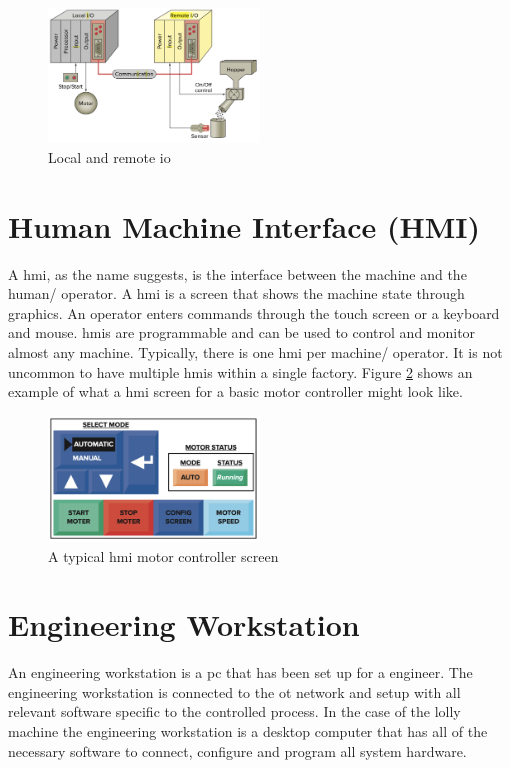    \begin{figure}[H]
        \centering
        \includegraphics[width = 0.5\textwidth]{2_images/localRemoteIo.png}
        \caption{Local and remote \acrshort{io}}
        \label{fig:localRemoteIo}
    \end{figure}
 
\section{Human Machine Interface (HMI)}
    A \acrfull{hmi}, as the name suggests, is the interface between the machine and the human/ operator. A \acrshort{hmi} is a screen that shows the machine state through graphics. An operator enters commands through the touch screen or a keyboard and mouse. \acrshort{hmi}s are programmable and can be used to control and monitor almost any machine\cite{petruzella2017programmable}. Typically, there is one \acrshort{hmi} per machine/ operator. It is not uncommon to have multiple \acrshort{hmi}s within a single factory. Figure \ref{fig:typHmi} shows an example of what a \acrshort{hmi} screen for a basic motor controller might look like.

    \begin{figure}[H]
        \centering
        \includegraphics[width = 0.5\textwidth]{2_images/typicalHmi.png}
        \caption{A typical \acrshort{hmi} motor controller screen\cite{petruzella2017programmable}}
        \label{fig:typHmi}
    \end{figure}    
    
\section{Engineering Workstation}
    An engineering workstation is a \acrshort{pc} that has been set up for a engineer. The engineering workstation is connected to the \acrshort{ot} network and setup with all relevant software specific to the controlled process. In the case of the lolly machine the engineering workstation is a desktop computer that has all of the necessary  software to connect, configure and program all system hardware. 
